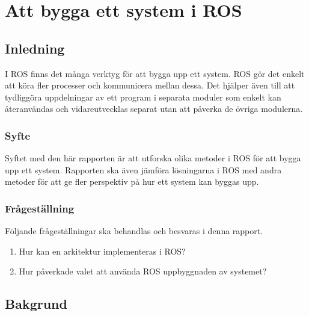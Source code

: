 \chapter{Att bygga ett system i ROS}
\label{cha:indiv-report-lundberg}

\section{Inledning}
\label{sec:introduction-lundberg}

I ROS finns det många verktyg för att bygga upp ett system. ROS gör det enkelt att köra fler processer och kommunicera mellan dessa. Det hjälper även till att tydliggöra uppdelningar av ett program i separata moduler som enkelt kan återanvändas och vidareutvecklas separat utan att påverka de övriga modulerna.


\subsection{Syfte}
\label{sec:purpose-lundberg}

Syftet med den här rapporten är att utforska olika metoder i ROS för att bygga upp ett system. Rapporten ska även jämföra lösningarna i ROS med andra metoder för att ge fler perspektiv på hur ett system kan byggas upp. 

\subsection{Frågeställning}
\label{sec:issue-lundberg}

Följande frågeställningar ska behandlas och besvaras i denna rapport.

\begin{enumerate}
	\item Hur kan en arkitektur implementeras i ROS?
	
	\item Hur påverkade valet att använda ROS uppbyggnaden av systemet?
	

\end{enumerate}


\section{Bakgrund}
\label{sec:background-lundberg}

